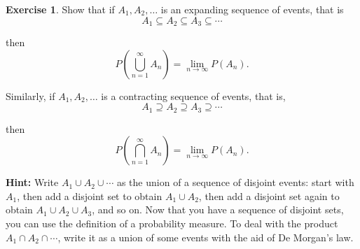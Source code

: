 \documentclass[
]{book}
\theoremstyle{definition}
\theoremstyle{definition}
\theoremstyle{definition}
\newtheorem{exercise}{Exercise}[chapter]
\theoremstyle{definition}
\theoremstyle{remark}
\begin{document}
\begin{exercise}
\protect\hypertarget{exr:unnamed-chunk-11}{}\label{exr:unnamed-chunk-11}Show that if \(A_1, A_2, \ldots\) is an expanding sequence of events, that is
\[ A_1 \subseteq A_2 \subseteq A_3 \subseteq \cdots \]

then
\[ P\left(\bigcup_{n=1}^{\infty} A_n\right) = \lim_{n \to \infty} P(A_n). \]

Similarly, if \(A_1, A_2, \ldots\) is a contracting sequence of events, that is,
\[ A_1 \supseteq A_2 \supseteq A_3 \supseteq \cdots \]

then
\[ P\left(\bigcap_{n=1}^{\infty} A_n\right) = \lim_{n \to \infty} P(A_n). \]

\textbf{Hint:} Write \(A_1 \cup A_2 \cup \cdots\) as the union of a sequence of disjoint events: start with \(A_1\), then add a disjoint set to obtain \(A_1 \cup A_2\), then add a disjoint set again to obtain \(A_1 \cup A_2 \cup A_3\), and so on. Now that you have a sequence of disjoint sets, you can use the definition of a probability measure. To deal with the product \(A_1 \cap A_2 \cap \cdots\), write it as a union of some events with the aid of De Morgan's law.
\end{exercise}
\end{document}
